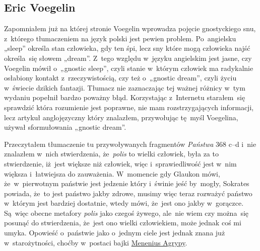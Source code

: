 \documentclass[a4paper,11pt]{article}
\begin{document}
\newpage

\subsection{Eric Voegelin}

\vspace{\spaceTwo}




\vspace{0em}



\vspace{0em}


\noindent
Zapomniałem już na której stronie Voegelin wprowadza pojęcie gnostyckiego
snu, z~którego tłumaczeniem na język polski jest pewien problem.
Po~angielsku „sleep” określa stan człowieka, gdy ten śpi, lecz sny
które mogą człowieka najść określa~się słowem „dream”. Z~tego
względu w~języku angielskim jest jasne, czy Voegelin mówił o~„gnostic
sleep”, czyli stanie w~którym człowiek ma radykalnie osłabiony
kontakt z~rzeczywistością, czy też o~„gnostic dream”, czyli życiu
w~świecie dzikich fantazji. Tłumacz nie zaznaczając tej ważnej różnicy
w~tym wydaniu popełnił bardzo poważny błąd. Korzystając z~Internetu
starałem~się sprawdzić która rozumienie jest poprawne, nie mam
rozstrzygających informacji, lecz artykuł anglojęzyczny który
znalazłem, przywołując tę~myśl Voegelina, używał sformułowania
„gnostic dream”.

\vspace{\spaceFour}







\noindent
{} Przeczytałem tłumaczenie tu przywoływanych fragmentów
\textit{Państwa} 368 c--d i~nie znalazłem w~nich stwierdzenia,
że~\textit{polis} to wielki człowiek, była za to stwierdzenie,
iż~jest większe niż człowiek, więc i~sprawiedliwość jest
w~nim większa i~łatwiejsza do zauważenia. W~momencie gdy Glaukon mówi,
że~w~pierwotnym państwie jest jedzenie który i~świnie jeść by~mogły,
Sokrates powiada, że~to jest państwo jakby zdrowe, musimy więc teraz
rozważyć państwo w~którym jest bardziej dostatnie, wtedy mówi, że~jest
ono jakby w~gorączce. Są~więc obecne metafory \textit{polis} jako czegoś
żywego, ale~nie wiem czy można~się posunąć do stwierdzenia, że~jest
ono wielki człowiekiem, może jednak coś mi umyka. Opowieść o~państwie
jako o~jednym ciele jest jednak znana już w~starożytności, choćby
w~postaci bajki
\href{https://en.wikipedia.org/wiki/Agrippa_Menenius_Lanatus_(consul_503_BC)}
{Menenius Agrypy}.
\end{document}
